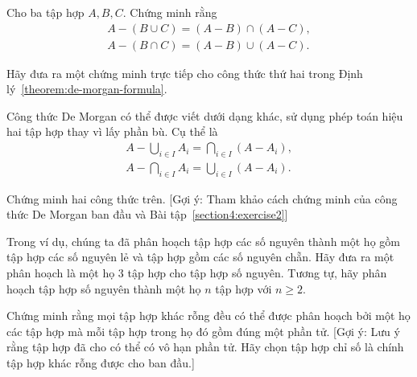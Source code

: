 \begin{exercise}\label{section4:exercise2}
    Cho ba tập hợp $A, B, C$. Chứng minh rằng
    \begin{equation*}
        \begin{split}
            A - (B\cup C) = (A - B) \cap (A - C), \\
            A - (B\cap C) = (A - B) \cup (A - C).
        \end{split}
    \end{equation*}
\end{exercise}

\begin{exercise}\label{section4:exercise3}
    Hãy đưa ra một chứng minh trực tiếp cho công thức thứ hai trong Định lý~\ref{theorem:de-morgan-formula}.
\end{exercise}

\begin{exercise}\label{section4:exercise4}
    Công thức De Morgan có thể được viết dưới dạng khác, sử dụng phép toán hiệu hai tập hợp thay vì lấy phần bù. Cụ thể là
    \begin{equation*}
        \begin{split}
            A - \bigcup_{i\in I}A_{i} = \bigcap_{i\in I}{(A - A_{i})}, \\
            A - \bigcap_{i\in I}A_{i} = \bigcup_{i\in I}{(A - A_{i})}.
        \end{split}
    \end{equation*}

    Chứng minh hai công thức trên. [Gợi ý: Tham khảo cách chứng minh của công thức De Morgan ban đầu và Bài tập~\ref{section4:exercise2}]
\end{exercise}

\begin{exercise}\label{section4:exercise5}
    Trong ví dụ, chúng ta đã phân hoạch tập hợp các số nguyên thành một họ gồm tập hợp các số nguyên lẻ và tập hợp gồm các số nguyên chẵn. Hãy đưa ra một phân hoạch là một họ 3 tập hợp cho tập hợp số nguyên. Tương tự, hãy phân hoạch tập hợp số nguyên thành một họ $n$ tập hợp với $n\geq 2$.
\end{exercise}

\begin{exercise}\label{section4:exercise6}
    Chứng minh rằng mọi tập hợp khác rỗng đều có thể được phân hoạch bởi một họ các tập hợp mà mỗi tập hợp trong họ đó gồm đúng một phần tử. [Gợi ý: Lưu ý rằng tập hợp đã cho có thể có vô hạn phần tử. Hãy chọn tập hợp chỉ số là chính tập hợp khác rỗng được cho ban đầu.]
\end{exercise}


